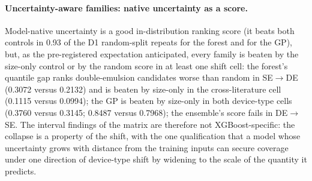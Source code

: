 \documentclass[11pt,a4paper]{article}
\begin{document}
\paragraph{Uncertainty-aware families: native uncertainty as a score.}
Model-native uncertainty is a good in-distribution ranking score (it beats
both controls in 0.93 of the D1 random-split repeats for the forest and for
the GP), but, as the pre-registered expectation anticipated, every
family is beaten by the size-only control or by the random score in at least
one shift cell: the forest's quantile gap ranks double-emulsion candidates
worse than random in SE$\to$DE (0.3072 versus 0.2132) and is beaten by
size-only in the cross-literature cell (0.1115 versus 0.0994); the GP
is beaten by size-only in both device-type cells (0.3760 versus 0.3145;
0.8487 versus 0.7968); the ensemble's score fails in DE$\to$SE. The interval
findings of the matrix are therefore not XGBoost-specific: the collapse is a
property of the shift, with the one qualification that a model whose
uncertainty grows with distance from the training inputs can secure coverage
under one direction of device-type shift by widening to the scale of the
quantity it predicts.
\end{document}
